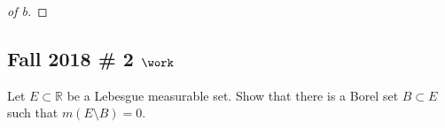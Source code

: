 \begin{solution}
\begin{proof}[of b]
\end{proof}

\end{solution}

\hypertarget{fall-2018-2-work}{%
\subsection{\texorpdfstring{Fall 2018 \# 2
\(\work\)}{Fall 2018 \# 2 \textbackslash work}}\label{fall-2018-2-work}}

Let \(E\subset {\mathbb{R}}\) be a Lebesgue measurable set. Show that
there is a Borel set \(B \subset E\) such that \(m(E\setminus B) = 0\).



